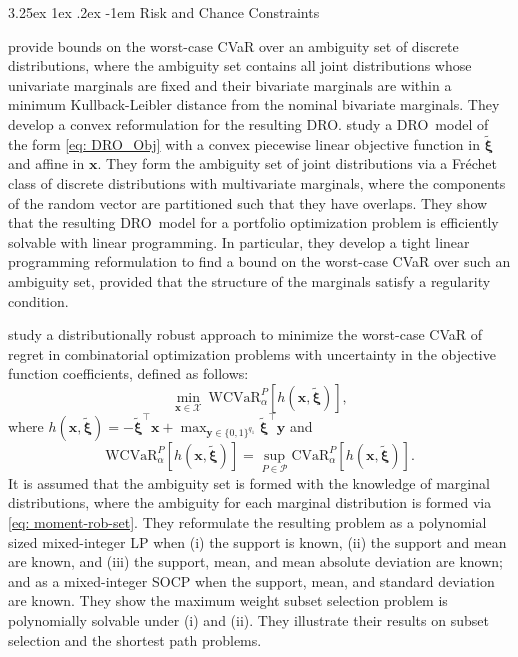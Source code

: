 \documentclass[final,onefignum,onetabnum]{class}
\makeatletter
\renewcommand\paragraph{\@startsection{paragraph}{4}{\z@}%
  {3.25ex \@plus1ex \@minus.2ex}%
  {-1em}%
  {\normalfont\normalsize\bfseries}}
\newcommand{\cccvar}[3]{\mathrm{CVaR}^{#1}_{#2} \left[ #3 \right]}
\newcommand{\bs}[1]{\boldsymbol{#1}} %
\newcommand{\Cs}[1]{\mathcal{#1}} %
\newcommand{\txi}{\tilde{\bs{\xi}}}
\newcommand{\dro}{DRO}
\makeatother
\begin{document}
\paragraph{Risk and Chance Constraints}

\citet{dhara2017} provide bounds on the worst-case CVaR over an ambiguity set of discrete distributions, where the ambiguity set %
contains all joint distributions whose univariate marginals are fixed and their bivariate marginals are within a minimum Kullback-Leibler distance from the nominal bivariate marginals. They  develop a convex reformulation for the resulting \dro. 
\citet{doan2015robustness} study a \dro\ model of the form  \eqref{eq: DRO_Obj} with a convex piecewise linear objective function in $\txi$ and affine in $\bs{x}$. They form the ambiguity set of joint  distributions via a Fr\'{e}chet class of discrete distributions with  multivariate marginals, where the components of the random vector are partitioned such that they have overlaps. They show that the resulting \dro\ model for a portfolio optimization problem  is efficiently solvable with linear programming. In particular, they develop a tight linear programming reformulation to find a bound on the worst-case CVaR over such an ambiguity set, provided that the structure of the marginals satisfy a regularity condition.  %

\citet{natarajan2014} study a distributionally robust approach to minimize the worst-case CVaR of regret in combinatorial optimization problems with uncertainty in the objective function coefficients, defined as follows:
\begin{equation*}
    \min_{\bs{x} \in \Cs{X}} \  \mathrm{WCVaR}_{\alpha}^{P}\left[h(\bs{x}, \txi)\right],
\end{equation*}
where $h(\bs{x}, \txi)=- \txi^{\top} \bs{x}+ \max_{\bs{y} \in \{0,1\}^{q_{1}}} \txi^{\top} \bs{y} $ and 
$$\mathrm{WCVaR}_{\alpha}^{P}\left[h(\bs{x}, \txi)\right]=\sup_{P \in \Cs{P}} \cccvar{P}{\alpha}{h(\bs{x}, \txi)}.$$ 
It is assumed that the ambiguity set is formed with the knowledge of marginal distributions, where the ambiguity for each marginal distribution is formed via \eqref{eq: moment-rob-set}. They reformulate the resulting problem as a polynomial sized mixed-integer LP when (i) the support is known, (ii) the support and mean are known, and (iii) the support, mean, and mean absolute deviation are
known; and as  a mixed-integer SOCP  when the support, mean, and standard deviation are known. They show the maximum weight subset selection problem is polynomially solvable under (i) and (ii). 
They illustrate their results on subset selection    and the shortest path problems. 
\end{document}
